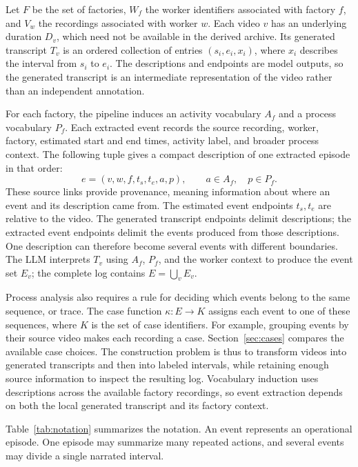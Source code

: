 Let $F$ be the set of factories, $W_f$ the worker identifiers associated with factory $f$, and $V_w$ the recordings associated with worker $w$. Each video $v$ has an underlying duration $D_v$, which need not be available in the derived archive. Its generated transcript $T_v$ is an ordered collection of entries $(s_i,e_i,x_i)$, where $x_i$ describes the interval from $s_i$ to $e_i$. The descriptions and endpoints are model outputs, so the generated transcript is an intermediate representation of the video rather than an independent annotation.

For each factory, the pipeline induces an activity vocabulary $A_f$ and a process vocabulary $P_f$. Each extracted event records the source recording, worker, factory, estimated start and end times, activity label, and broader process context. The following tuple gives a compact description of one extracted episode in that order:
\begin{equation}
 e=(v,w,f,t_s,t_e,a,p), \qquad a\in A_f,\quad p\in P_f.
\end{equation}
These source links provide provenance, meaning information about where an event and its description came from. The estimated event endpoints $t_s,t_e$ are relative to the video. The generated transcript endpoints delimit descriptions; the extracted event endpoints delimit the events produced from those descriptions. One description can therefore become several events with different boundaries. The LLM interprets $T_v$ using $A_f$, $P_f$, and the worker context to produce the event set $E_v$; the complete log contains $E=\bigcup_v E_v$.

Process analysis also requires a rule for deciding which events belong to the same sequence, or trace. The case function $\kappa:E\rightarrow K$ assigns each event to one of these sequences, where $K$ is the set of case identifiers. For example, grouping events by their source video makes each recording a case. Section~\ref{sec:cases} compares the available case choices. The construction problem is thus to transform videos into generated transcripts and then into labeled intervals, while retaining enough source information to inspect the resulting log. Vocabulary induction uses descriptions across the available factory recordings, so event extraction depends on both the local generated transcript and its factory context.

Table~\ref{tab:notation} summarizes the notation. An event represents an operational episode. One episode may summarize many repeated actions, and several events may divide a single narrated interval.


